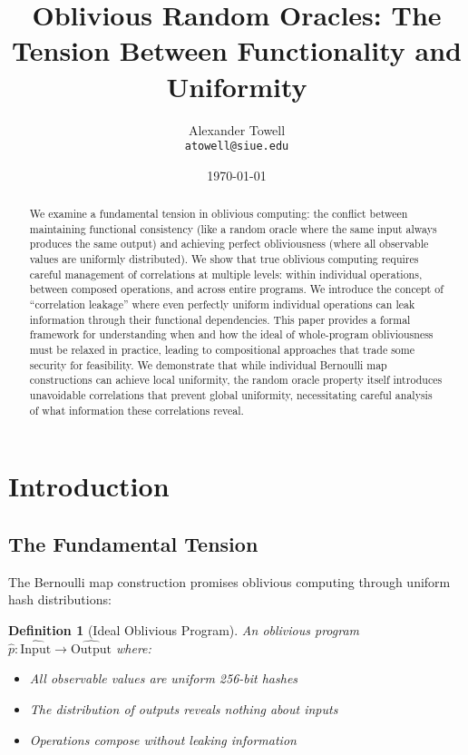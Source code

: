 \documentclass[11pt,final]{article}
\title{Oblivious Random Oracles: The Tension Between Functionality and Uniformity}
\author{
    Alexander Towell\\
    \texttt{atowell@siue.edu}
}
\date{\today}
\newtheorem{definition}[theorem]{Definition}
\begin{document}
\maketitle

\begin{abstract}
We examine a fundamental tension in oblivious computing: the conflict between maintaining functional consistency (like a random oracle where the same input always produces the same output) and achieving perfect obliviousness (where all observable values are uniformly distributed). We show that true oblivious computing requires careful management of correlations at multiple levels: within individual operations, between composed operations, and across entire programs. We introduce the concept of ``correlation leakage'' where even perfectly uniform individual operations can leak information through their functional dependencies. This paper provides a formal framework for understanding when and how the ideal of whole-program obliviousness must be relaxed in practice, leading to compositional approaches that trade some security for feasibility. We demonstrate that while individual Bernoulli map constructions can achieve local uniformity, the random oracle property itself introduces unavoidable correlations that prevent global uniformity, necessitating careful analysis of what information these correlations reveal.
\end{abstract}


\ObliviousNotationGuide

\section{Introduction}

\subsection{The Fundamental Tension}

The Bernoulli map construction promises oblivious computing through uniform hash distributions:

\begin{definition}[Ideal Oblivious Program]
An oblivious program $\hat{p}: \widehat{\text{Input}} \to \widehat{\text{Output}}$ where:
\begin{itemize}
    \item All observable values are uniform 256-bit hashes
    \item The distribution of outputs reveals nothing about inputs
    \item Operations compose without leaking information
\end{itemize}
\end{definition}
\end{document}
